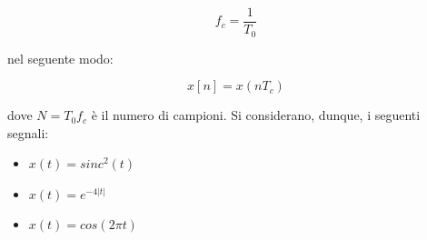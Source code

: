 \begin{equation}
	f_c = \frac{1}{T_0}
\end{equation}

nel seguente modo:

\begin{equation}
	x[n] = x(nT_c)
\end{equation}

dove $N=T_0 f_c$ è il numero di campioni. Si considerano, dunque, i seguenti 
segnali:

\begin{itemize}
	\item $x(t) = sinc^2 (t)$
	\item $x(t) = e^{-4|t|}$
	\item $x(t) = cos(2 \pi t)$
\end{itemize}


